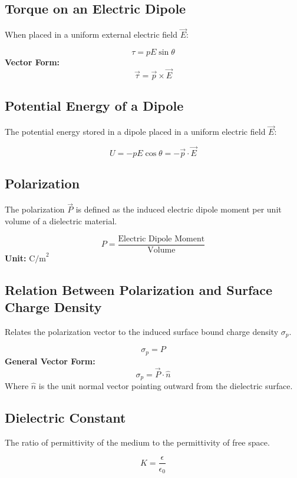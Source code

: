 \documentclass[11pt,a4paper]{article}
\begin{document}
\subsection{Torque on an Electric Dipole}
When placed in a uniform external electric field $\vec{E}$:
\begin{formulabox}
    \[ \tau = pE \sin\theta \]
    \textbf{Vector Form:}
    \[ \vec{\tau} = \vec{p} \times \vec{E} \]
\end{formulabox}

\subsection{Potential Energy of a Dipole}
The potential energy stored in a dipole placed in a uniform electric field $\vec{E}$:
\begin{formulabox}
    \[ U = -pE \cos\theta = -\vec{p} \cdot \vec{E} \]
\end{formulabox}

\subsection{Polarization}
The polarization $\vec{P}$ is defined as the induced electric dipole moment per unit volume of a dielectric material.
\begin{formulabox}[Polarization]
    \[ P = \frac{\text{Electric Dipole Moment}}{\text{Volume}} \]
    \textbf{Unit:} $\text{C/m}^2$
\end{formulabox}

\subsection{Relation Between Polarization and Surface Charge Density}
\begin{pyqbox}
    Relates the polarization vector to the induced surface bound charge density $\sigma_p$.
\end{pyqbox}

\begin{formulabox}
    \[ \sigma_p = P \]
    \textbf{General Vector Form:}
    \[ \sigma_p = \vec{P} \cdot \hat{n} \]
    Where $\hat{n}$ is the unit normal vector pointing outward from the dielectric surface.
\end{formulabox}

\subsection{Dielectric Constant}
The ratio of permittivity of the medium to the permittivity of free space.
\begin{formulabox}
    \[ K = \frac{\epsilon}{\epsilon_0} \]
\end{formulabox}
\end{document}
